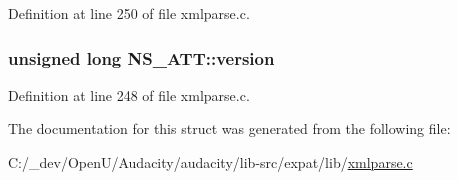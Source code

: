 Definition at line 250 of file xmlparse.\+c.

\subsubsection[{\texorpdfstring{version}{version}}]{\setlength{\rightskip}{0pt plus 5cm}unsigned long N\+S\+\_\+\+A\+T\+T\+::version}\hypertarget{struct_n_s___a_t_t_a796133bdb5abab6c3b0b34aa2bd942bf}{}\label{struct_n_s___a_t_t_a796133bdb5abab6c3b0b34aa2bd942bf}


Definition at line 248 of file xmlparse.\+c.



The documentation for this struct was generated from the following file\+:\begin{DoxyCompactItemize}
\item 
C\+:/\+\_\+dev/\+Open\+U/\+Audacity/audacity/lib-\/src/expat/lib/\hyperlink{xmlparse_8c}{xmlparse.\+c}\end{DoxyCompactItemize}
